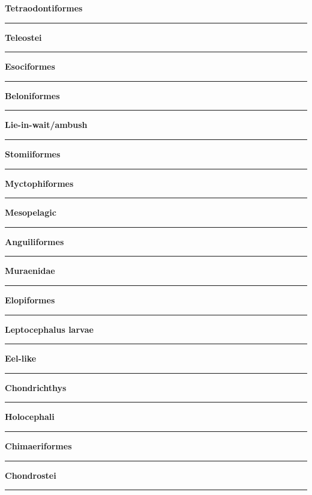 \documentclass[11pt]{exam}
\newcommand*\Matching[1]{
\ifprintanswers
	\textbf{#1}
\else
	\rule{2.1in}{0.4pt}
\fi
}
\newlength\matchlena
\newlength\matchlenb
\newcommand\MatchQuestion[2]{%
	\setlength\matchlenb{\linewidth}
	\addtolength\matchlenb{-\matchlena}
	\parbox[t]{\matchlena}{\Matching{#1}}\enspace\parbox[t]{\matchlenb}{#2}}
\begin{document}
\begin{questions}
\begin{multicols}{2}
\question\MatchQuestion{Tetraodontiformes}{}
\vspace{2\baselineskip}

\question\MatchQuestion{Teleostei}{}
\vspace{2\baselineskip}

\question\MatchQuestion{Esociformes}{}
\vspace{2\baselineskip}

\question\MatchQuestion{Beloniformes}{}
\vspace{2\baselineskip}

\question\MatchQuestion{Lie-in-wait/ambush}{}
\vspace{2\baselineskip}

\question\MatchQuestion{Stomiiformes}{}
\vspace{2\baselineskip}

\question\MatchQuestion{Myctophiformes}{}
\vspace{2\baselineskip}

\question\MatchQuestion{Mesopelagic}{}
\vspace{2\baselineskip}

\question\MatchQuestion{Anguiliformes}{}
\vspace{2\baselineskip}

\question[\textsc{ec}]\MatchQuestion{Muraenidae}{}
\vspace{2\baselineskip}

\question\MatchQuestion{Elopiformes}{}
\vspace{2\baselineskip}

\question\MatchQuestion{Leptocephalus larvae}{}
\vspace{2\baselineskip}

\question[\textsc{ec}]\MatchQuestion{Eel-like}{}
\vspace{2\baselineskip}


\question\MatchQuestion{Chondrichthys}{}
\vspace{2\baselineskip}

\question\MatchQuestion{Holocephali}{}
\vspace{2\baselineskip}

\question\MatchQuestion{Chimaeriformes}{}
\vspace{2\baselineskip}

\question\MatchQuestion{Chondrostei}{}
\vspace{2\baselineskip}


\end{multicols}
\end{questions}
\end{document}
